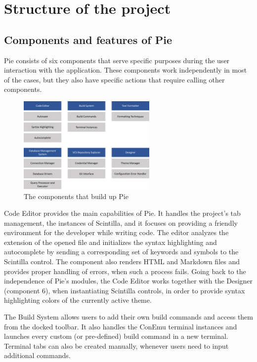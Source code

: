 \chapter{Structure of the project}
\thispagestyle{pagestyle}

\section{Components and features of Pie}

Pie consists of six components that serve specific purposes during the user interaction with the application. These components work independently in most of the cases, but they also have specific actions that require calling other components.

\begin{figure}[h]
\centering
\includegraphics[width=0.6\textwidth]{images/structure.png}
\caption{The components that build up Pie}
\label{fig:fig2,1.}
\end{figure}

Code Editor provides the main capabilities of Pie. It handles the project's tab management, the instances of Scintilla, and it focuses on providing a friendly environment for the developer while writing code. The editor analyzes the extension of the opened file and initializes the syntax highlighting and autocomplete by sending a corresponding set of keywords and symbols to the Scintilla control. The component also renders HTML and Markdown files and provides proper handling of errors, when such a process fails. Going back to the independence of Pie's modules, the Code Editor works together with the Designer (component 6), when instantiating Scintilla controls, in order to provide syntax highlighting colors of the currently active theme.

The Build System allows users to add their own build commands and access them from the docked toolbar. It also handles the ConEmu terminal instances and launches every custom (or pre-defined) build command in a new terminal. Terminal tabs can also be created manually, whenever users need to input additional commands.

